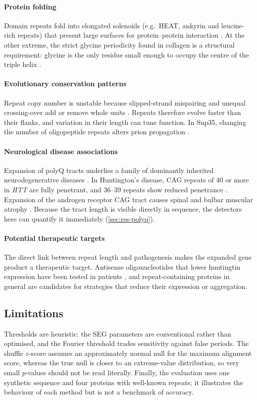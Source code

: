 \documentclass[11pt,a4paper]{article}
\begin{document}
\paragraph{Protein folding} Domain repeats fold into elongated solenoids (e.g.\ HEAT, ankyrin and leucine-rich
repeats) that present large surfaces for protein--protein interaction \cite{kajava2012tandem,andrade2001repeats}.
At the other extreme, the strict glycine periodicity found in collagen is a structural requirement: glycine
is the only residue small enough to occupy the centre of the triple helix \cite{shoulders2009collagen}.

\paragraph{Evolutionary conservation patterns} Repeat copy number is unstable because slipped-strand mispairing
and unequal crossing-over add or remove whole units \cite{levinson1987slipped}. Repeats therefore evolve faster
than their flanks, and variation in their length can tune function. In Sup35, changing the number of
oligopeptide repeats alters prion propagation \cite{liu1999oligopeptide}.

\paragraph{Neurological disease associations} Expansion of polyQ tracts underlies a family of dominantly inherited
neurodegenerative diseases \cite{orr2007trinucleotide}. In Huntington's disease, CAG repeats of 40 or more in
\emph{HTT} are fully penetrant, and 36--39 repeats show reduced penetrance \cite{hdcrg1993}. Expansion of the
androgen receptor CAG tract causes spinal and bulbar muscular atrophy \cite{laspada1991sbma}. Because the tract
length is visible directly in sequence, the detectors here can quantify it immediately (\cref{sec:res-polyq}).

\paragraph{Potential therapeutic targets} The direct link between repeat length and pathogenesis makes the
expanded gene product a therapeutic target. Antisense oligonucleotides that lower huntingtin expression have
been tested in patients \cite{tabrizi2019targeting}, and repeat-containing proteins in general are candidates for
strategies that reduce their expression or aggregation.

\subsection{Limitations}
Thresholds are heuristic: the SEG parameters are conventional rather than optimised, and the
Fourier threshold trades sensitivity against false periods. The shuffle $z$-score assumes an approximately normal
null for the maximum alignment score, whereas the true null is closer to an extreme-value distribution, so very
small $p$-values should not be read literally. Finally, the evaluation uses one synthetic sequence and four proteins
with well-known repeats; it illustrates the behaviour of each method but is not a benchmark of accuracy.
\end{document}
